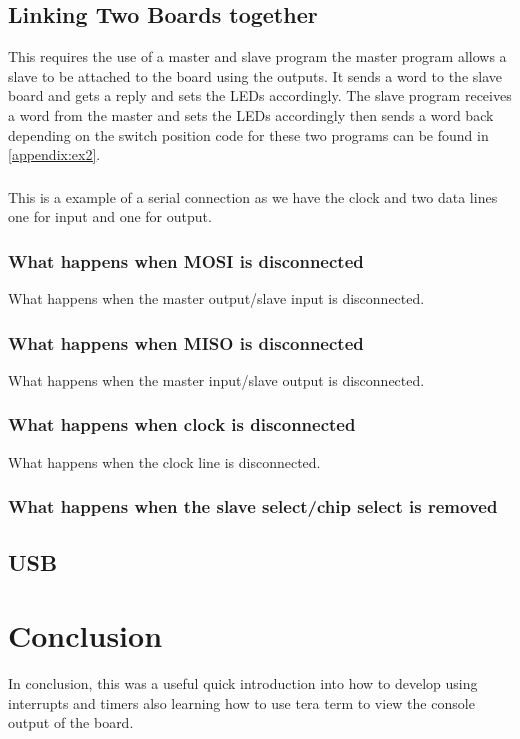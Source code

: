 \documentclass[a4paper,12pt]{scrartcl}
\begin{document}
{		\subsection{Linking Two Boards together}
		{
			This requires the use of a master and slave program the master program allows a slave to be attached to the board using the outputs. It sends a word to the slave board and gets a reply and sets the LEDs accordingly. The slave program receives a word from the master and sets the LEDs accordingly then sends a word back depending on the switch position code for these two programs can be found in \cref{appendix:ex2}.
			\subsubsection{}{
				This is a example of a serial connection as we have the clock and two data lines one for input and one for output.
			}
			\subsubsection{What happens when MOSI is disconnected}
			{
				What happens when the master output/slave input is disconnected.
			}
			\subsubsection{What happens when MISO is disconnected}
			{
				What happens when the master input/slave output is disconnected.
			}
			\subsubsection{What happens when clock is disconnected}
			{
				What happens when the clock line is disconnected.
			}
			\subsubsection{What happens when the slave select/chip select is removed}
			{
				
			}
		}
		\subsection{USB}
		{
			
		}
	}

	\section{Conclusion}
	{
		In conclusion, this was a useful quick introduction into how to develop using interrupts and timers also learning how to use tera term to view the console output of the board.
	}
	
	\newpage
	
	\printbibliography[heading=bibintoc,title=References]
\end{document}
